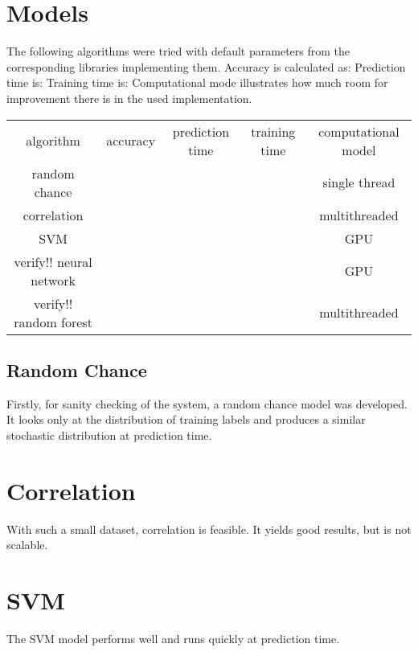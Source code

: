 \documentclass{article}
\begin{document}
\section{Models}
The following algorithms were tried with default parameters from the corresponding libraries implementing them.
Accuracy is calculated as:
Prediction time is:
Training time is:
Computational mode illustrates how much room for improvement there is in the used implementation.
\\ \par
{}
\begin{tabular}{ c | c | c | c | c }
algorithm      & accuracy & prediction time & training time & computational model \\
random chance  & & & & single thread \\
correlation    & & & & multithreaded \\
SVM            & & & & GPU \\ verify!!
neural network & & & & GPU \\  verify!!
random forest  & & & & multithreaded \\
\end{tabular}


\subsection{Random Chance}
Firstly, for sanity checking of the system, a random chance model was developed.
It looks only at the distribution of training labels and produces a similar stochastic distribution at prediction time.


\section{Correlation}
With such a small dataset, correlation is feasible.
It yields good results, but is not scalable.


\section{SVM}
The SVM model performs well and runs quickly at prediction time.
\end{document}
